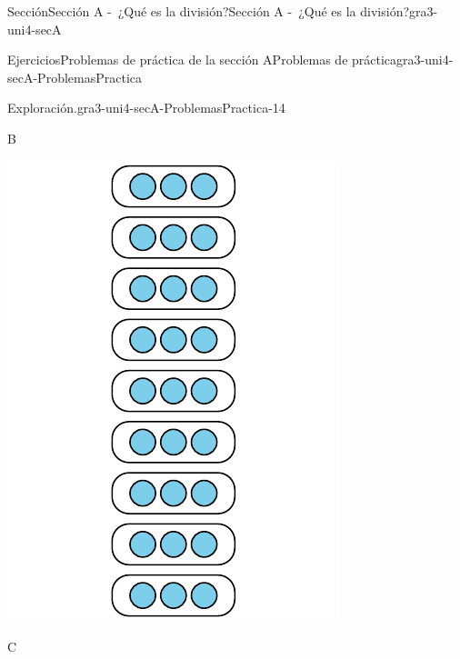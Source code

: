 \documentclass[twoside,10pt,]{article}
\begin{document}
\begin{sectionptx}{Sección}{Sección A -~¿Qué es la división?}{}{Sección A -~¿Qué es la división?}{}{}{gra3-uni4-secA}
\begin{exercises-subsection}{Ejercicios}{Problemas de práctica de la sección A}{}{Problemas de práctica}{}{}{gra3-uni4-secA-ProblemasPractica}
\begin{divisionexercise}{12}{Exploración.}{}{gra3-uni4-secA-ProblemasPractica-14}
\begin{sidebyside}{3}{0}{0}{0.02}
\begin{sbspanel}{0.32}%
B%
\par
\includegraphics[width=\linewidth]{external/svg-source/tikz-file-151675.pdf}
\end{sbspanel}%
\begin{sbspanel}{0.32}%
C%
\par

\end{sbspanel}
\end{sidebyside}
\end{divisionexercise}
\end{exercises-subsection}
\end{sectionptx}
\end{document}
